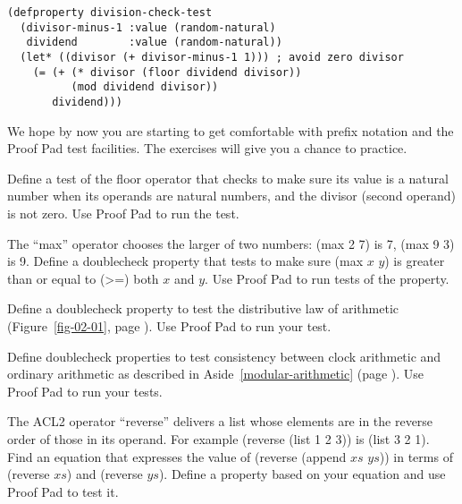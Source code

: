 \label{division-check-test}
\begin{Verbatim}
(defproperty division-check-test
  (divisor-minus-1 :value (random-natural)
   dividend        :value (random-natural))
  (let* ((divisor (+ divisor-minus-1 1))) ; avoid zero divisor
    (= (+ (* divisor (floor dividend divisor))
          (mod dividend divisor))
       dividend)))
\end{Verbatim}

We hope by now you are starting to get comfortable with prefix notation
and the Proof Pad test facilities.
The exercises will give you a chance to practice.

\begin{ExerciseList}
\Exercise Define a test of the floor operator
that checks to make sure its value is a natural number
when its operands are natural numbers,
and the divisor (second operand) is not zero.
Use Proof Pad to run the test.

\Exercise The ``max'' operator chooses the larger of two numbers:
(max 2 7) is 7, (max 9 3) is 9.
Define a doublecheck property that tests to make sure
(max $x$ $y$) is greater than or equal to (>=) both $x$ and $y$.
Use Proof Pad to run tests of the property.

\Exercise
Define a doublecheck property to test the distributive law
of arithmetic (Figure~\ref{fig-02-01}, page \pageref{fig-02-01}).
Use Proof Pad to run your test.

\Exercise
Define doublecheck properties to test
consistency between clock
arithmetic and ordinary arithmetic
as described in
Aside~\ref{modular-arithmetic} (page \pageref{modular-arithmetic}).
Use Proof Pad to run your tests.

\Exercise
The ACL2 operator ``reverse'' delivers a list whose
elements are in the reverse order of those in its operand.
For example (reverse (list 1 2 3)) is (list 3 2 1).
Find an equation that expresses the value of (reverse (append $xs$ $ys$))
in terms of (reverse $xs$) and (reverse $ys$).
Define a property based on your equation and
use Proof Pad to test it.

\end{ExerciseList}

